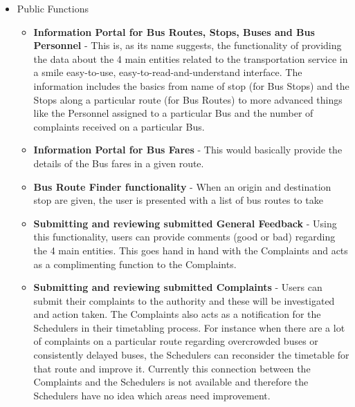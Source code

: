 \begin{itemize}

\item Public Functions
\begin{itemize}
\item \textbf{Information Portal for Bus Routes, Stops, Buses and Bus Personnel} - This is, as its name suggests, the functionality of providing the data about the 4 main entities related to the transportation service in a smile easy-to-use, easy-to-read-and-understand interface. The information includes the basics from name of stop (for Bus Stops) and the Stops along a particular route (for Bus Routes) to more advanced things like the Personnel assigned to a particular Bus and the number of complaints received on a particular Bus.
\item \textbf{Information Portal for Bus Fares} - This would basically provide the details of the Bus fares in a given route.
\item \textbf{Bus Route Finder functionality} - When an origin and destination stop are given, the user is presented with a list of bus routes to take
\item \textbf{Submitting and reviewing submitted General Feedback} - Using this functionality, users can provide comments (good or bad) regarding the 4 main entities. This goes hand in hand with the Complaints and acts as a complimenting function to the Complaints.
\item \textbf{Submitting and reviewing submitted Complaints} - Users can submit their complaints to the authority and these will be investigated and action taken. The Complaints also acts as a notification for the Schedulers in their timetabling process. For instance when there are a lot of complaints on a particular route regarding overcrowded buses or consistently delayed buses, the Schedulers can reconsider the timetable for that route and improve it. Currently this connection between the Complaints and the Schedulers is not available and therefore the Schedulers have no idea which areas need improvement.
\end{itemize}


\end{itemize}
